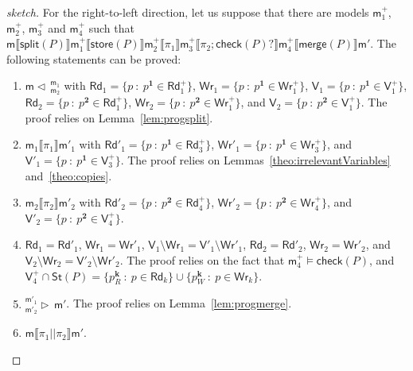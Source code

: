 \documentclass{llncs}
\newcommand{\progStore}{\mathsf{store}}
\newcommand{\progOkChange}{\mathsf{check}}
\newcommand{\progsplit}{\mathsf{split}}
\newcommand{\progmerge}{\mathsf{merge}}
\newcommand{\cp}[2]{{#2}^\mathbf{#1}}
\newcommand{\cpr}[2]{\cp{#1}{#2}_R}
\newcommand{\cpw}[2]{\cp{#1}{#2}_W}
\newcommand{\modl}{\mathsf m}
\newcommand{\mrg}[3]{ ^{#2}_{#3} \triangleright \, #1 }
\newcommand{\pll}{ {||} }							%
\newcommand{\splt}[3]{ #1 \triangleleft \, ^{#2}_{#3} }
\newcommand{\readset}{\mathsf{Rd}}
\newcommand{\valuset}{\mathsf{V}}
\newcommand{\writeset}{\mathsf{Wr}}
\newcommand{\storeset}{\mathsf{St}}
\newcommand{\intPgm}[1]{\llbracket #1 \rrbracket}
\newcommand{\set}[1]{\{#1\}}
\newcommand{\suchthat}{~ : ~}
\begin{document}
\begin{proof}[sketch]
For the right-to-left direction, let us suppose that there are
models $\modl^+_1$, $\modl^+_2$, $\modl^+_3$ and $\modl^+_4$ such that
$\modl \intPgm{\progsplit(P)} \modl^+_1 \intPgm{\progStore(P)} \modl^+_2 \intPgm{\pi_1} \modl^+_3
\intPgm{\pi_2 ; \progOkChange(P)?} \modl^+_4 \intPgm{\progmerge(P)} \modl'$.
The following statements can be proved:
\begin{enumerate}
  \item\label{pllequivalence:rtl:split}
        $\splt{\modl}{\modl_1}{\modl_2}$ with
        $\readset_1 = \set{ p \suchthat \cp 1 p \in \readset^+_1}$,
        $\writeset_1 = \set{ p \suchthat \cp 1 p \in \writeset^+_1}$,
        $\valuset_1 = \set{ p \suchthat \cp 1 p \in \valuset^+_1}$,
        $\readset_2 = \set{ p \suchthat \cp 2 p \in \readset^+_1}$,
        $\writeset_2 = \set{ p \suchthat \cp 2 p \in \writeset^+_1}$, and
        $\valuset_2 = \set{ p \suchthat \cp 2 p \in \valuset^+_1}$.
        The proof relies on Lemma~\ref{lem:progsplit}.
  \item\label{pllequivalence:rtl:pi1}
        $\modl_1 \intPgm{\pi_1} \modl'_1$ with
        $\readset'_1 = \set{ p \suchthat \cp 1 p \in \readset^+_3}$,
        $\writeset'_1 = \set{ p \suchthat \cp 1 p \in \writeset^+_3}$, and
        $\valuset'_1 = \set{ p \suchthat \cp 1 p \in \valuset^+_3}$.
        The proof relies on Lemmas~\ref{theo:irrelevantVariables} and~\ref{theo:copies}.
  \item\label{pllequivalence:rtl:pi2}
        $\modl_2 \intPgm{\pi_2} \modl'_2$ with
        $\readset'_2 = \set{ p \suchthat \cp 2 p \in \readset^+_4}$,
        $\writeset'_2 = \set{ p \suchthat \cp 2 p \in \writeset^+_4}$, and
        $\valuset'_2 = \set{ p \suchthat \cp 2 p \in \valuset^+_4}$.
  \item\label{pllequivalence:rtl:check}
        $\readset_1 = \readset'_1 $, $\writeset_1 = \writeset'_1 $,
        $\valuset_1 \setminus \writeset_1 = \valuset'_1 \setminus \writeset'_1$,
        $\readset_2 = \readset'_2 $, $\writeset_2 = \writeset'_2 $, and
        $\valuset_2 \setminus \writeset_2 = \valuset'_2 \setminus \writeset'_2$.
        The proof relies on the fact that $\modl^+_4 \models \progOkChange(P)$, and
        $\valuset^+_4 \cap \storeset(P) =
        \set{ \cpr k p \suchthat p \in \readset_k} \cup
        \set{ \cpw k p \suchthat p \in \writeset_k}$.
  \item\label{pllequivalence:rtl:merge}
        $\mrg{\modl'}{\modl'_1}{\modl'_2}$.
        The proof relies on Lemma~\ref{lem:progmerge}.
  \item $\modl \intPgm{\pi_1 \pll \pi_2} \modl'$.
\end{enumerate}
\end{proof}
\end{document}
